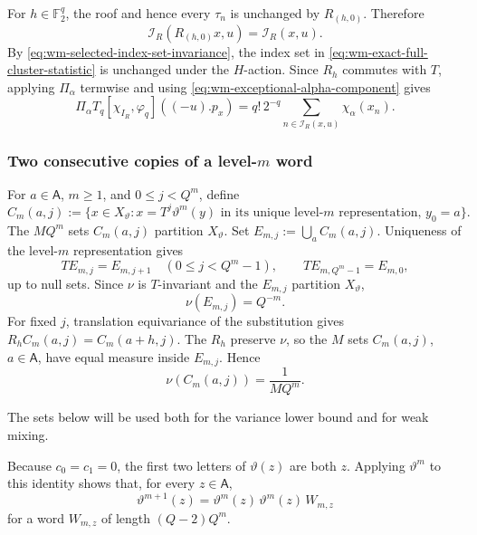 \documentclass[11pt,reqno,a4paper]{amsart}
\numberwithin{equation}{section}
\theoremstyle{compact}
\theoremstyle{definition}
\theoremstyle{definition}
\begin{document}
For $h\in\mathbb F_2^q$, the roof and hence every $\tau_n$ is unchanged by
$R_{(h,0)}$.  Therefore
\begin{equation}\label{eq:wm-selected-index-set-invariance}
  \mathcal I_R(R_{(h,0)}x,u)=\mathcal I_R(x,u).
\end{equation}
By \eqref{eq:wm-selected-index-set-invariance}, the index set in
\eqref{eq:wm-exact-full-cluster-statistic} is unchanged under the
$H$-action.  Since $R_h$ commutes with $T$, applying $\Pi_\alpha$ termwise
and using \eqref{eq:wm-exceptional-alpha-component} gives
\begin{equation}\label{eq:wm-alpha-projection-pattern-statistic}
  \Pi_\alpha T_q[\chi_{I_R},\varphi_q]((-u).p_x)
  =q!\,2^{-q}
    \sum_{n\in\mathcal I_R(x,u)}\chi_\alpha(x_n).
\end{equation}

\subsubsection{Two consecutive copies of a level-$m$ word}

For $a\in\mathsf A$, $m\geq1$, and $0\leq j<Q^m$, define
\begin{equation}\label{eq:wm-address-set-definition}
  C_m(a,j)
  :=\{x\in X_\vartheta:
       x=T^j\vartheta^m(y)\text{ in its unique level-$m$ representation, }
       y_0=a\}.
\end{equation}
The $MQ^m$ sets $C_m(a,j)$ partition $X_\vartheta$.  Set
$E_{m,j}:=\bigcup_aC_m(a,j)$.  Uniqueness of the level-$m$ representation
gives
\[
  T E_{m,j}=E_{m,j+1}\quad(0\leq j<Q^m-1),
  \qquad
  T E_{m,Q^m-1}=E_{m,0},
\]
up to null sets.  Since $\nu$ is $T$-invariant and the $E_{m,j}$ partition
$X_\vartheta$,
\[
  \nu(E_{m,j})=Q^{-m}.
\]
For fixed $j$, translation equivariance of the substitution gives
$R_hC_m(a,j)=C_m(a+h,j)$.  The $R_h$ preserve $\nu$, so the $M$ sets
$C_m(a,j)$, $a\in\mathsf A$, have equal measure inside $E_{m,j}$.  Hence
\begin{equation}\label{eq:wm-address-set-measure}
  \nu(C_m(a,j))=\frac1{MQ^m}.
\end{equation}

The sets below will be used both for the variance lower bound and for weak
mixing.

Because $c_0=c_1=0$, the first two letters of $\vartheta(z)$ are both $z$.
Applying $\vartheta^m$ to this identity shows that, for every
$z\in\mathsf A$,
\begin{equation}\label{eq:wm-repeated-word-prefix}
  \vartheta^{m+1}(z)
  =\vartheta^m(z)\,\vartheta^m(z)\,W_{m,z}
\end{equation}
for a word $W_{m,z}$ of length $(Q-2)Q^m$.
\end{document}
